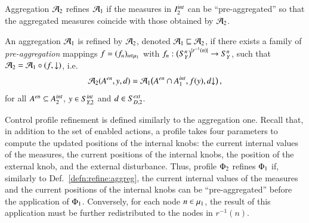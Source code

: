 \documentclass[runningheads]{llncs}
\makeatletter
\newcommand{\defn}[1]{Def.~\ref{defn:#1}}
\newcommand{\ie}[1][\@ ]{i.e.{#1}}
\newcommand{\abstracts}[1][]{\sqsubseteq\ifx#1\relax\else^{#1}\fi}
\newcommand{\isrefinedby}{\abstracts}
\newcommand{\interface}[1][]{I\ifx#1\relax\else^{#1}\fi}
\newcommand{\map}[1][]{\mu\ifx#1\relax\else^{#1}\fi}
\newcommand{\actions}[1][]{A\ifx\relax#1\relax\else^{#1}\fi}
\newcommand{\measure}[1][]{y\ifx#1\relax\else^{#1}\fi}
\newcommand{\measurerange}[1][]{Y\ifx#1\relax\else^{#1}\fi}
\newcommand{\disturbance}[1][]{d\ifx#1\relax\else^{#1}\fi}
\newcommand{\disturbancerange}[1][]{D\ifx#1\relax\else^{#1}\fi}
\newcommand{\profile}[1][]{\Phi\ifx#1\relax\else^{#1}\fi}
\newcommand{\aggregation}[1][]{\mathcal{A}\ifx#1\relax\else^{#1}\fi}
\newcommand{\project}[3][]{{#2}{\downarrow}\ifx#1\relax\else_{#3}\fi}
\newcommand{\vectorspace}[1][]{S\ifx#1\relax\else^{#1}\fi}
\newcommand{\external}[2][]{\ifx\relax#2\relax#1\mathit{ext}\else#2[#1\mathit{ext}]\fi}
\newcommand{\internal}[2][]{#2[#1\mathit{int}]}
\newcommand{\enabled}[2][]{{#2[\mathit{en}]\ifx#1\relax\else_{#1}\fi}}
\makeatother
\begin{document}
Aggregation $\aggregation_2$ refines $\aggregation_1$ if the measures in $\internal{\interface}_2$ can be ``pre-aggregated'' %
so that the aggregated measures coincide with those obtained by $\aggregation_2$.

\begin{definition}
  \label{defn:refine:aggreg}
  An aggregation $\aggregation_1$ is refined by $\aggregation_2$, denoted $\aggregation_1 \isrefinedby \aggregation_2$, if there exists a family of \emph{pre-aggregation} mappings $f = (f_n)_{n \in \map_1}$ with $f_n: \bigl(\vectorspace[n]_{\measurerange}\bigr)^{|r^{-1}(n)|} \rightarrow \vectorspace[n]_{\measurerange}$, such that $\aggregation_2 = \aggregation_1 \circ (f, \project{}{\external{\vectorspace}_{\disturbancerange,1}})$, \ie
  \[
  \aggregation_2(
  \enabled{\actions},
  \measure,
  \disturbance
  )
  =
  \aggregation_1\bigl(
  \enabled{\actions} \cap \internal{\actions}_{1},
  f(\measure),
  \project{\disturbance}{\external{\vectorspace}_{\disturbancerange,1}}
  \bigr)
  \,,
  \]
  for all $\enabled{\actions} \subseteq \internal{\actions}_{2}$, $\measure \in \internal{\vectorspace}_{\measurerange,2}$ and $\disturbance \in \external{\vectorspace}_{\disturbancerange,2}$.
\end{definition}

Control profile refinement is defined similarly to the aggregation one. Recall that, in addition to the set of enabled actions, a profile takes four parameters to compute the updated positions of the internal knobs: the current internal values of the measures, the current positions of the internal knobs, the position of the external knob, and the external disturbance.  Thus, profile $\profile_2$ refines $\profile_1$ if, similarly to \defn{refine:aggreg}, the current internal values of the measures and the current positions of the internal knobs can be ``pre-aggregated'' before the application of $\profile_1$.  Conversely, for each node $n \in \map_1$, the result of this application must be further redistributed to the nodes in $r^{-1}(n)$.
\end{document}
